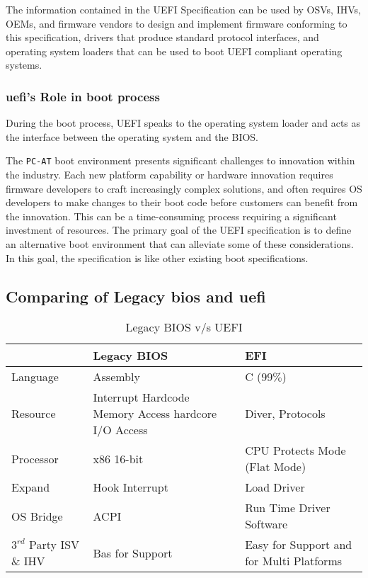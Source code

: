 The information contained in the UEFI Specification can be used by OSVs, IHVs, OEMs,
and firmware vendors to design and implement firmware conforming to this specification, drivers
that produce standard protocol interfaces, and operating system loaders that can be used to boot
UEFI compliant operating systems.

\subsubsection{\gls{uefi}'s Role in boot process}

During the boot process, UEFI speaks to the operating system loader and acts as the interface between the operating system and the BIOS.

The \verb|PC-AT| boot environment presents significant challenges to innovation within the
industry. Each new platform capability or hardware innovation requires firmware developers to
craft increasingly complex solutions, and often requires OS developers to make changes to their
boot code before customers can benefit from the innovation. This can be a time-consuming process
requiring a significant investment of resources. The primary goal of the UEFI specification is to
define an alternative boot environment that can alleviate some of these considerations. In this goal, the specification is like other existing boot specifications.

\subsection{Comparing of Legacy \gls{bios} and \gls{uefi}}

\begin{table}
	\centering
	\renewcommand{\arraystretch}{2}
	\caption{Legacy BIOS v/s UEFI}\label{table:legacy-bios-vs-uefi}
	\begin{tabular}{l | p{5cm} | p{5cm}}
		& Legacy BIOS & EFI
		\\ \hline \hline
		Language & Assembly & C ($ 99\% $)
		\\ \hline
		Resource & Interrupt Hardcode Memory Access hardcore I/O Access & Diver, Protocols
		\\ \hline
		Processor & x86 16-bit & CPU Protects Mode (Flat Mode)
		\\ \hline
		Expand & Hook Interrupt & Load Driver
		\\ \hline
		OS Bridge & ACPI & Run Time Driver Software
		\\ \hline
		$ 3^{rd} $ Party ISV \& IHV & Bas for Support & Easy for Support and for Multi Platforms
		\\ \hline
	\end{tabular}
\end{table}





